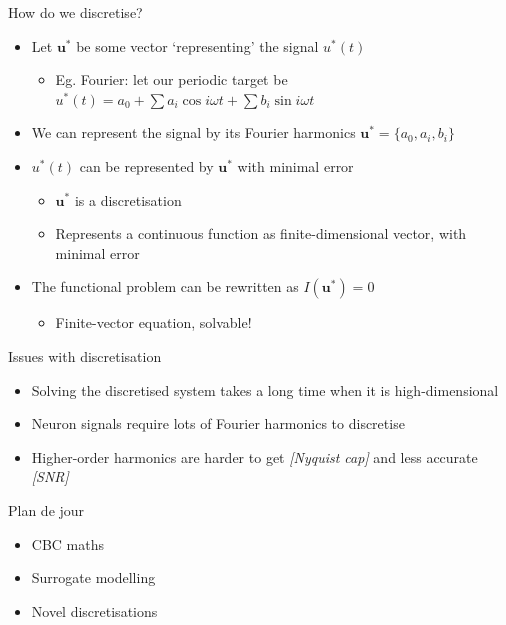 \documentclass[presentation]{beamer}
\begin{document}
\begin{frame}[label={sec:org07ddedd}]{How do we discretise?}
\begin{itemize}[<+->]
\item Let \(\mathbf{u^*}\) be some vector `representing' the signal \(u^*(t)\)
\begin{itemize}
\item Eg. Fourier: let our periodic target be \(u^*(t) = a_0 + \sum a_i \cos i\omega t + \sum b_i \sin i\omega t\)
\end{itemize}
\item We can represent the signal by its Fourier harmonics \(\mathbf{u^*}=\{a_0, a_i, b_i\}\)
\item \(u^*(t)\) can be represented by \(\mathbf{u}^*\) with minimal error
\begin{itemize}
\item \(\mathbf{u^*}\) is a discretisation
\item Represents a continuous function as finite-dimensional vector, with minimal error
\end{itemize}
\item The functional problem can be rewritten as \(I\left(\mathbf{u}^*\right)=0\)
\begin{itemize}
\item Finite-vector equation, solvable!
\end{itemize}
\end{itemize}
\end{frame}

\begin{frame}[label={sec:org49b70ba}]{Issues with discretisation}
\begin{itemize}
\item Solving the discretised system takes a long time when it is high-dimensional
\vfill
\item Neuron signals require lots of Fourier harmonics to discretise
\vfill
\item Higher-order harmonics are harder to get \emph{[Nyquist cap]} and less accurate \emph{[SNR]}
\end{itemize}
\end{frame}

\begin{frame}[label={sec:orgeab5ee7}]{Plan de jour}
\begin{itemize}
\item CBC maths
\item \alert{Surrogate modelling}
\item Novel discretisations
\end{itemize}
\end{frame}
\end{document}
